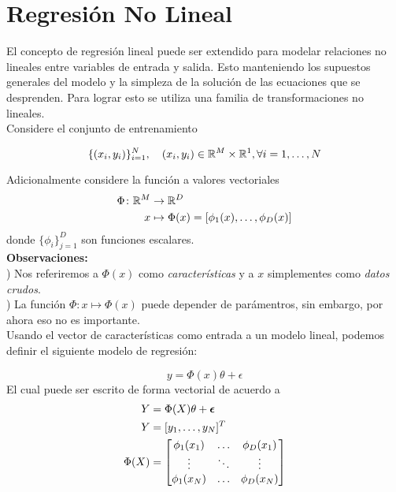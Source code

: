 
\section{Regresión No Lineal}
El concepto de regresión lineal puede ser extendido para modelar relaciones no lineales entre variables de entrada y salida. Esto manteniendo los supuestos generales del modelo y la simpleza de la  solución de las ecuaciones que se desprenden. Para lograr esto se utiliza una familia de transformaciones no lineales.\\

Considere el conjunto de entrenamiento

\begin{equation}
	\{(x_i,y_i)\}_{i=1}^N,\quad (x_i, y_i)\in{\mathbb R}^M\times{\mathbb R}^1,\forall i=1,\ldots,N
	\label{eq:training_set_nl}
\end{equation}

Adicionalmente considere la función a valores vectoriales 
\begin{align}
  \Phi \colon {\mathbb R}^M &\to {\mathbb R}^D \nonumber\\
  x &\mapsto \Phi(x)=[\phi_1(x),\ldots,\phi_D(x)]
\end{align}
donde $\{ \phi_i \}_{j=1}^D$ son funciones escalares. \\

\noindent\textbf{Observaciones:}\\

) Nos referiremos a $\Phi(x)$ como \emph{características} y a $x$ simplementes como \emph{datos crudos}. \\

) La función $\Phi:x\mapsto\Phi(x)$ puede depender de parámentros, sin embargo, por ahora eso no es importante. \\

Usando el vector de características como entrada a un modelo lineal, podemos definir el siguiente modelo de regresión: 

\begin{equation}
    y = \Phi(x)\theta + \epsilon
\end{equation}
El cual puede ser escrito de forma vectorial de acuerdo a 
\begin{align}
    Y &= \Phi(X)\theta + {\bm \epsilon}\\
    Y &= [y_1,\ldots,y_N]^T \nonumber\\
    \Phi(X) &= \left[ \begin{matrix} \phi_1(x_1)& \ldots & \phi_D(x_1)\\
    \vdots & \ddots & \vdots \\
    \phi_1(x_N) & \ldots & \phi_D(x_N)\\
    \end{matrix} \right]
\end{align}

